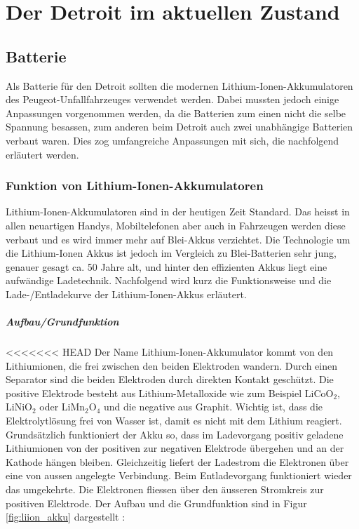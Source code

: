 \chapter{Der Detroit im aktuellen Zustand}

\section{Batterie}
Als Batterie für den Detroit sollten die modernen Lithium-Ionen-Akkumulatoren des Peugeot-Unfallfahrzeuges verwendet werden. Dabei mussten jedoch einige Anpassungen vorgenommen werden, da die Batterien zum einen nicht die selbe Spannung besassen, zum anderen beim Detroit auch zwei unabhängige Batterien verbaut waren. Dies zog umfangreiche Anpassungen mit sich, die nachfolgend erläutert werden.

\subsection{Funktion von Lithium-Ionen-Akkumulatoren} \label{kap_liion}

Lithium-Ionen-Akkumulatoren sind in der heutigen Zeit Standard. Das heisst in allen neuartigen Handys, Mobiltelefonen aber auch in Fahrzeugen werden diese verbaut und es wird immer mehr auf Blei-Akkus verzichtet. Die Technologie um die Lithium-Ionen Akkus ist jedoch im Vergleich zu Blei-Batterien sehr jung, genauer gesagt ca. 50 Jahre alt, und hinter den effizienten Akkus liegt eine aufwändige Ladetechnik. Nachfolgend wird kurz die Funktionsweise und die Lade-/Entladekurve der Lithium-Ionen-Akkus erläutert.

\paragraph{Aufbau/Grundfunktion}

<<<<<<< HEAD
Der Name Lithium-Ionen-Akkumulator kommt von den Lithiumionen, die frei zwischen den beiden Elektroden wandern. Durch einen Separator sind die beiden Elektroden durch direkten Kontakt geschützt. Die positive Elektrode besteht aus Lithium-Metalloxide wie zum Beispiel LiCoO$_2$, LiNiO$_2$ oder LiMn$_2$O$_4$ und die negative aus Graphit. Wichtig ist, dass die Elektrolytlösung frei von Wasser ist, damit es nicht mit dem Lithium reagiert.
Grundsätzlich funktioniert der Akku so, dass im Ladevorgang positiv geladene Lithiumionen von der positiven zur negativen Elektrode übergehen und an der Kathode hängen bleiben. Gleichzeitig liefert der Ladestrom die Elektronen über eine von aussen angelegte Verbindung. Beim Entladevorgang funktioniert wieder das umgekehrte. Die Elektronen fliessen über den äusseren Stromkreis zur positiven Elektrode. Der Aufbau und die Grundfunktion sind in Figur \ref{fig:liion_akku} dargestellt \cite{liion_akku_aufbau_funktion2}:

